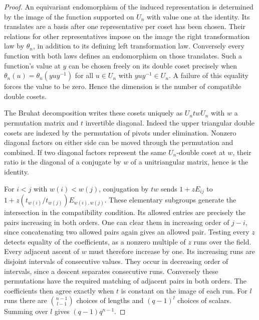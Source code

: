 \documentclass[a4paper,11pt]{article}
\theoremstyle{definition}
\theoremstyle{remark}
\numberwithin{equation}{section}
\begin{document}
\begin{proof}
An equivariant endomorphism of the induced representation is
determined by the image of the function supported on \(U_n\)
with value one at the identity. Its translates are a basis after
one representative per coset has been chosen. Their relations for
other representatives impose on the image the right transformation
law by \(\theta_n\), in addition to its defining left transformation
law. Conversely every function with both laws defines an
endomorphism on those translates. Such a function's value at \(y\)
can be chosen freely on its double coset precisely when
\(\theta_n(u)=\theta_n(yuy^{-1})\) for all \(u\in U_n\) with
\(yuy^{-1}\in U_n\). A failure of this equality forces the value
to be zero. Hence the dimension is the number of compatible double
cosets.

The Bruhat decomposition writes these cosets uniquely as \(U_n t w U_n\)
with \(w\) a permutation matrix and \(t\) invertible diagonal.
Indeed the upper triangular double cosets are indexed by the
permutation of pivots under elimination. Nonzero diagonal factors
on either side can be moved through the permutation and combined.
If two diagonal factors represent the same \(U_n\)-double coset
at \(w\), their ratio is the diagonal of a conjugate by \(w\) of
a unitriangular matrix, hence is the identity.

For \(i<j\) with \(w(i)<w(j)\), conjugation by \(tw\) sends
\(1+zE_{ij}\) to \(1+z(t_{w(i)}/t_{w(j)})E_{w(i),w(j)}\).
These elementary subgroups generate the intersection in the
compatibility condition. Its allowed entries are precisely the
pairs increasing in both orders. One can clear them in increasing
order of \(j-i\), since concatenating two allowed pairs again gives
an allowed pair. Testing every \(z\) detects equality of the
coefficients, as a nonzero multiple of \(z\) runs over the field.
Every adjacent ascent of \(w\) must therefore increase by one.
Its increasing runs are disjoint intervals of consecutive values.
They occur in decreasing order of intervals, since a descent
separates consecutive runs. Conversely these permutations have
the required matching of adjacent pairs in both orders. The
coefficients then agree exactly when \(t\) is constant on the
image of each run. For \(l\) runs there are
\(\binom{n-1}{l-1}\) choices of lengths and \((q-1)^l\) choices
of scalars. Summing over \(l\) gives \((q-1)q^{n-1}\).
\end{proof}
\end{document}
